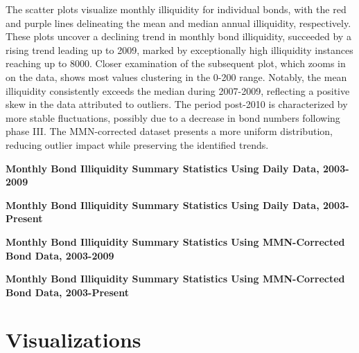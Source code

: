 \documentclass{article}
\newcommand*{\PathToOutput}{../output/}%
\begin{document}
The scatter plots visualize monthly illiquidity for individual bonds, with the red and purple lines delineating the mean and median annual illiquidity, respectively. These plots uncover a declining trend in monthly bond illiquidity, succeeded by a rising trend leading up to 2009, marked by exceptionally high illiquidity instances reaching up to 8000. Closer examination of the subsequent plot, which zooms in on the data, shows most values clustering in the 0-200 range. Notably, the mean illiquidity consistently exceeds the median during 2007-2009, reflecting a positive skew in the data attributed to outliers. The period post-2010 is characterized by more stable fluctuations, possibly due to a decrease in bond numbers following phase III. The MMN-corrected dataset presents a more uniform distribution, reducing outlier impact while preserving the identified trends.


\begin{table}[hbt!]
\centering
\textbf{\large Monthly Bond Illiquidity Summary Statistics Using Daily Data, 2003-2009}

\label{table:illiq_summary_paper}
\end{table}


\begin{table}[hbt!]
\centering
\textbf{\large Monthly Bond Illiquidity Summary Statistics Using Daily Data, 2003-Present}
\resizebox{\textwidth}{!}{%
    
}
\label{table: illiq_summary_new}
\end{table}


\begin{table}[hbt!]
\centering
\textbf{\large Monthly Bond Illiquidity Summary Statistics Using MMN-Corrected Bond Data, 2003-2009}

\label{table:illiq_daily_summary_mmn_paper}
\end{table}


\begin{table}[hbt!]
\centering
\textbf{\large Monthly Bond Illiquidity Summary Statistics Using MMN-Corrected Bond Data, 2003-Present}
\resizebox{\textwidth}{!}{%
    
}
\label{table: illiq_daily_summary_mmn_new}
\end{table}


\section{Visualizations}
\end{document}
